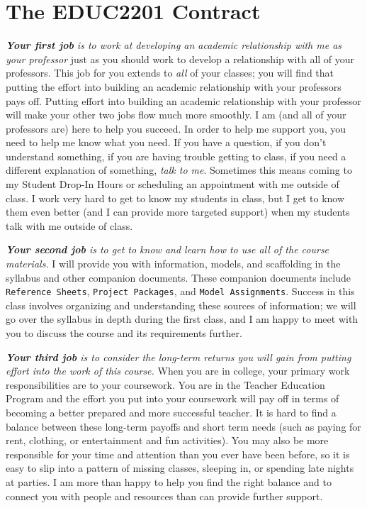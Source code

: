 \documentclass{tufte-handout}
\begin{document}
\part{The EDUC2201 Contract}
\begin{fullwidth}

\textit{\textbf{Your first job} is to work at developing an academic relationship with me as your professor} just as you should work to develop a relationship with all of your professors. This job for you extends to \emph{all} of your classes; you will find that putting the effort into building an academic relationship with your professors pays off. Putting effort into building an academic relationship with your professor will make your other two jobs flow much more smoothly. I am (and all of your professors are) here to help you succeed. In order to help me support you, you need to help me know what you need. If you have a question, if you don't understand something, if you are having trouble getting to class, if you need a different explanation of something, \emph{talk to me}. Sometimes this means coming to my Student Drop-In Hours or scheduling an appointment with me outside of class. I work very hard to get to know my students in class, but I get to know them even better (and I can provide more targeted support) when my students talk with me outside of class.

\textit{\textbf{Your second job} is to get to know and learn how to use all of the course materials.} I will provide you with information, models, and scaffolding in the syllabus and other companion documents. These companion documents include \texttt{Reference Sheets}, \texttt{Project Packages}, and \texttt{Model Assignments}. Success in this class involves organizing and understanding these sources of information; we will go over the syllabus in depth during the first class, and I am happy to meet with you to discuss the course and its requirements further.

\textit{\textbf{Your third job} is to consider the long-term returns you will gain from putting effort into the work of this course.} When you are in college, your primary work responsibilities are to your coursework. You are in the Teacher Education Program and the effort you put into your coursework will pay off in terms of becoming a better prepared and more successful teacher. It is hard to find a balance between these long-term payoffs and short term needs (such as paying for rent, clothing, or entertainment and fun activities). You may also be more responsible for your time and attention than you ever have been before, so it is easy to slip into a pattern of missing classes, sleeping in, or spending late nights at parties. I am more than happy to help you find the right balance and to connect you with people and resources than can provide further support.


\end{fullwidth}
\end{document}
